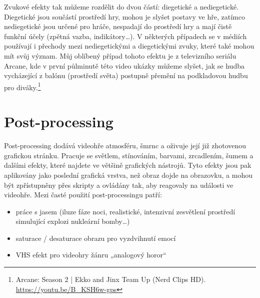 Zvukové efekty tak můžeme rozdělit do dvou částí: diegetické a nediegetické. Diegetické jsou součástí prostředí hry, mohou je slyšet postavy ve hře, zatímco nediegetické jsou určené pro hráče, nespadají do prostředí hry a mají čistě funkční účely (zpětná vazba, indikátory…). V některých případech se v médiích používají i přechody mezi nediegetickými a diegetickými zvuky, které také mohou mít svůj význam. Můj oblíbený případ tohoto efektu je z televizního seriálu Arcane, kde v první půlminutě této video ukázky můžeme slyšet, jak se hudba vycházející z balónu (prostředí světa) postupně přemění na podkladovou hudbu pro diváky.\footnote{Arcane: Season 2 | Ekko and Jinx Team Up (Nerd Clips HD). \url{https://youtu.be/B_KSH6w-gps}}

\section{Post-processing}
Post-processing dodává videohře atmosféru, šmrnc a oživuje její již zhotovenou grafickou stránku. Pracuje se světlem, stínováním, barvami, zrcadlením, šumem a dalšími efekty, které najdete ve většině grafických nástrojů. Tyto efekty jsou pak aplikovány jako poslední grafická vrstva, než obraz dojde na obrazovku, a mohou být zpřístupněny přes skripty a ovládány tak, aby reagovaly na události ve videohře. Mezi časté použití post-processingu patří:

\begin{itemize}
    \item práce s jasem (iluze fáze noci, realistické, intenzivní zesvětlení prostředí simulující explozi nukleární bomby…)
    \item saturace / desaturace obrazu pro vyzdvihnutí emocí
    \item VHS efekt pro videohry žánru „analogový horor“
\end{itemize}